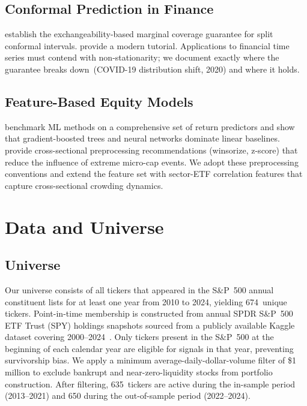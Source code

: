 \documentclass[journal]{IEEEtran}
\begin{document}
\subsection{Conformal Prediction in Finance}
\citet{vovk2005algorithmic} establish the exchangeability-based
marginal coverage guarantee for split conformal intervals.
\citet{angelopoulos2021gentle} provide a modern tutorial.
Applications to financial time series must contend with
non-stationarity; we document exactly where the guarantee breaks
down~(COVID-19 distribution shift, 2020) and where it holds.

\subsection{Feature-Based Equity Models}
\citet{gu2020empirical} benchmark ML methods on a comprehensive
set of return predictors and show that gradient-boosted trees and
neural networks dominate linear baselines.
\citet{gkx2020} provide cross-sectional preprocessing recommendations
(winsorize, z-score) that reduce the influence of extreme
micro-cap events.
We adopt these preprocessing conventions and extend the feature set
with sector-ETF correlation features that capture cross-sectional
crowding dynamics.

\section{Data and Universe}
\label{sec:data}

\subsection{Universe}
Our universe consists of all tickers that appeared in the S\&P~500
annual constituent lists for at least one year from 2010 to 2024,
yielding 674~unique tickers.
Point-in-time membership is constructed from annual SPDR S\&P~500
ETF Trust (SPY) holdings snapshots sourced from a publicly available
Kaggle dataset covering 2000--2024~\citep{kaggle_spy2024}.
Only tickers present in the S\&P~500 at the beginning of each
calendar year are eligible for signals in that year, preventing
survivorship bias.
We apply a minimum average-daily-dollar-volume filter of
\$1\,million to exclude bankrupt and near-zero-liquidity stocks from
portfolio construction.
After filtering, 635~tickers are active during the in-sample period
(2013--2021) and 650 during the out-of-sample period (2022--2024).
\end{document}
